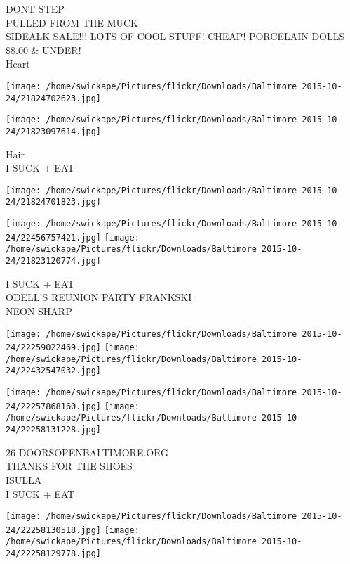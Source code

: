 \documentclass[10pt,letterpaper]{article}
\begin{document}
DONT STEP\\
PULLED FROM THE MUCK\\
SIDEALK SALE!!!  LOTS OF COOL STUFF!  CHEAP!  PORCELAIN DOLLS \$8.00 \& UNDER!\\
Heart\\
\pagebreak

\texttt{[image: /home/swickape/Pictures/flickr/Downloads/Baltimore 2015-10-24/21824702623.jpg]}

\vspace{0.25in}
\texttt{[image: /home/swickape/Pictures/flickr/Downloads/Baltimore 2015-10-24/21823097614.jpg]}

Hair\\
I SUCK + EAT\\
\pagebreak

\texttt{[image: /home/swickape/Pictures/flickr/Downloads/Baltimore 2015-10-24/21824701823.jpg]}

\vspace{0.25in}
\texttt{[image: /home/swickape/Pictures/flickr/Downloads/Baltimore 2015-10-24/22456757421.jpg]}
\texttt{[image: /home/swickape/Pictures/flickr/Downloads/Baltimore 2015-10-24/21823120774.jpg]}

I SUCK + EAT\\
ODELL'S REUNION PARTY FRANKSKI\\
NEON SHARP\\
\pagebreak

\texttt{[image: /home/swickape/Pictures/flickr/Downloads/Baltimore 2015-10-24/22259022469.jpg]}
\texttt{[image: /home/swickape/Pictures/flickr/Downloads/Baltimore 2015-10-24/22432547032.jpg]}

\texttt{[image: /home/swickape/Pictures/flickr/Downloads/Baltimore 2015-10-24/22257868160.jpg]}
\texttt{[image: /home/swickape/Pictures/flickr/Downloads/Baltimore 2015-10-24/22258131228.jpg]}

26 DOORSOPENBALTIMORE.ORG\\
THANKS FOR THE SHOES\\
ISULLA\\
I SUCK + EAT\\
\pagebreak

\texttt{[image: /home/swickape/Pictures/flickr/Downloads/Baltimore 2015-10-24/22258130518.jpg]}
\texttt{[image: /home/swickape/Pictures/flickr/Downloads/Baltimore 2015-10-24/22258129778.jpg]}
\end{document}
